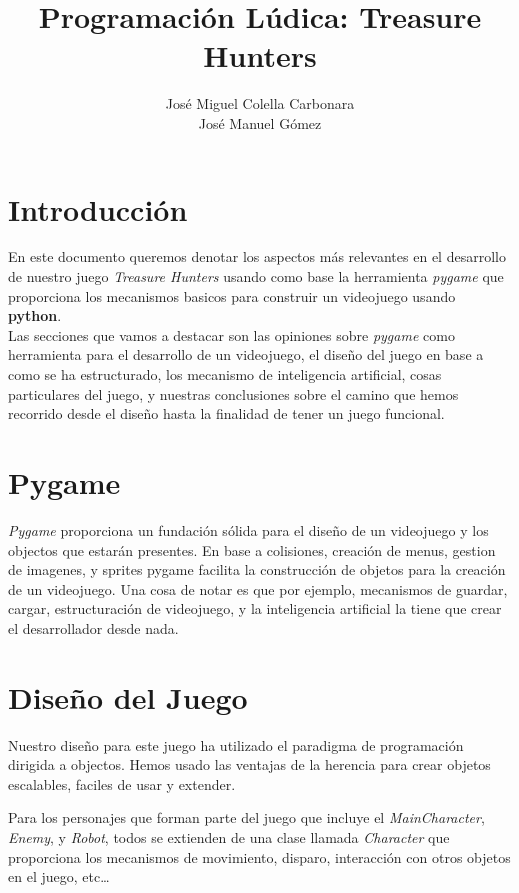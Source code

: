 \documentclass{article}
\title{Programación Lúdica: Treasure Hunters}
\author{José Miguel Colella Carbonara\\José Manuel Gómez}
\begin{document}
\maketitle

\section{Introducción}

En este documento queremos denotar los aspectos más relevantes en el desarrollo
de nuestro juego \emph{Treasure Hunters} usando como base la herramienta \textit{pygame}
que proporciona los mecanismos basicos para construir un videojuego usando \textbf{python}. \hfill \\

Las secciones que vamos a destacar son las opiniones sobre \textit{pygame} como herramienta
para el desarrollo de un videojuego, el diseño del juego en base a como se ha estructurado, los mecanismo
de inteligencia artificial, cosas particulares del juego, y nuestras conclusiones sobre el
camino que hemos recorrido desde el diseño hasta la finalidad de tener un juego funcional.


\section{Pygame}

\textit{Pygame} proporciona un fundación sólida para el diseño de un videojuego
y los objectos que estarán presentes. En base a colisiones, creación de menus,
gestion de imagenes, y sprites pygame facilita la construcción de objetos
para la creación de un videojuego.
Una cosa de notar es que por ejemplo, mecanismos de guardar, cargar, estructuración
de videojuego, y la inteligencia artificial la tiene que crear el desarrollador
desde nada.

\section{Diseño del Juego}

\indent Nuestro diseño para este juego ha utilizado el paradigma de programación dirigida
a objectos. Hemos usado las ventajas de la herencia para crear objetos escalables, faciles
de usar y extender.

Para los personajes que forman parte del juego que incluye el \textit{MainCharacter},
\textit{Enemy}, y \textit{Robot}, todos se extienden de una clase llamada \textit{Character}
que proporciona los mecanismos de movimiento, disparo, interacción con otros objetos en el juego, etc\ldots \hfill \\
\end{document}
